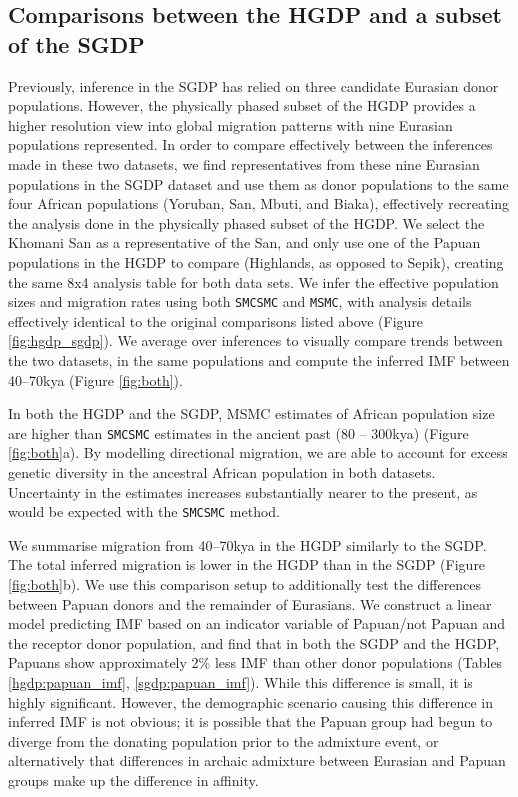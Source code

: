 \documentclass{article}
\begin{document}
\subsection{Comparisons between the HGDP and a subset of the SGDP}

Previously, inference in the SGDP has relied on three candidate Eurasian donor populations. However, the physically phased subset of the HGDP provides a higher resolution view into global migration patterns with nine Eurasian populations represented. In order to compare effectively between the inferences made in these two datasets, we find representatives from these nine Eurasian populations in the SGDP dataset and use them as donor populations to the same four African populations (Yoruban, San, Mbuti, and Biaka), effectively recreating the analysis done in the physically phased subset of the HGDP. We select the Khomani San as a representative of the San, and only use one of the Papuan populations in the HGDP to compare (Highlands, as opposed to Sepik), creating the same 8x4 analysis table for both data sets. We infer the effective population sizes and migration rates using both {\tt SMCSMC} and {\tt MSMC}, with analysis details effectively identical to the original comparisons listed above (Figure \ref{fig:hgdp_sgdp}). We average over inferences to visually compare trends between the two datasets, in the same populations and compute the inferred IMF between 40--70kya (Figure \ref{fig:both}).  

In both the HGDP and the SGDP, MSMC estimates of African population size are higher than {\tt SMCSMC} estimates in the ancient past (80 -- 300kya) (Figure \ref{fig:both}a). By modelling directional migration, we are able to account for excess genetic diversity in the ancestral African population in both datasets. Uncertainty in the estimates increases substantially nearer to the present, as would be expected with the {\tt SMCSMC} method. 

We summarise migration from 40--70kya in the HGDP similarly to the SGDP. The total inferred migration is lower in the HGDP than in the SGDP (Figure \ref{fig:both}b). We use this comparison setup to additionally test the differences between Papuan donors and the remainder of Eurasians. We construct a linear model predicting IMF based on an indicator variable of Papuan/not Papuan and the receptor donor population, and find that in both the SGDP and the HGDP, Papuans show approximately 2\% less IMF than other donor populations (Tables \ref{hgdp:papuan_imf}, \ref{sgdp:papuan_imf}). While this difference is small, it is highly significant. However, the demographic scenario causing this difference in inferred IMF is not obvious; it is possible that the Papuan group had begun to diverge from the donating population prior to the admixture event, or alternatively that differences in archaic admixture between Eurasian and Papuan groups make up the difference in affinity. 
\end{document}
